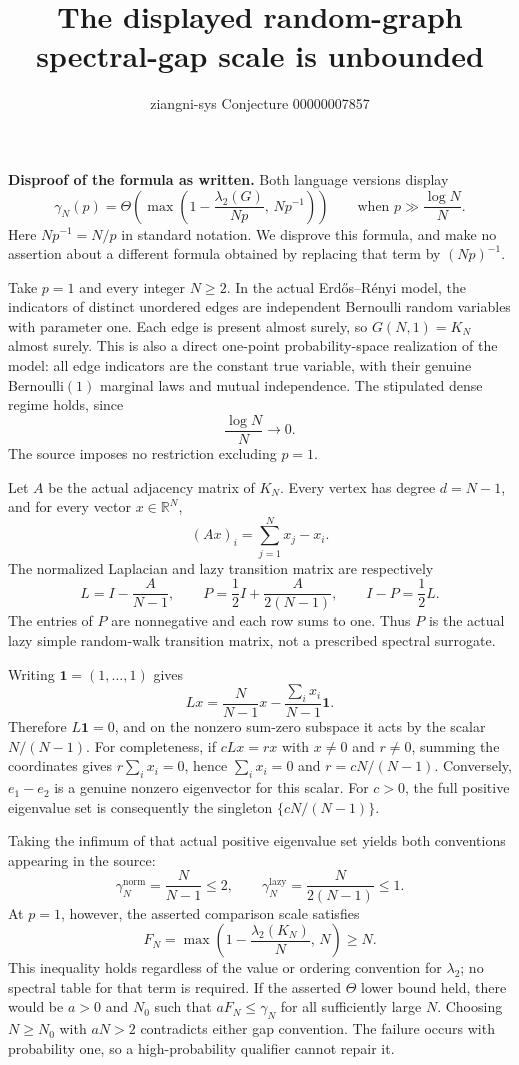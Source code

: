 \documentclass[11pt]{article}
\title{The displayed random-graph spectral-gap scale is unbounded}
\author{ziangni-sys \quad Conjecture 00000007857}
\date{}
\begin{document}
\maketitle
\vspace{-2em}
\textbf{Disproof of the formula as written.} Both language versions display
\[
 \gamma_N(p)=\Theta\!\left(\max\!\left(1-\frac{\lambda_2(G)}{Np},\,Np^{-1}\right)\right)
 \qquad\text{when }p\gg\frac{\log N}{N}.
\]
Here $Np^{-1}=N/p$ in standard notation. We disprove this formula, and make no assertion about a different formula obtained by replacing that term by $(Np)^{-1}$.

Take $p=1$ and every integer $N\ge2$. In the actual Erd\H{o}s--R\'enyi model, the indicators of distinct unordered edges are independent Bernoulli random variables with parameter one. Each edge is present almost surely, so $G(N,1)=K_N$ almost surely. This is also a direct one-point probability-space realization of the model: all edge indicators are the constant true variable, with their genuine Bernoulli$(1)$ marginal laws and mutual independence. The stipulated dense regime holds, since
\[
 \frac{\log N}{N}\longrightarrow0.
\]
The source imposes no restriction excluding $p=1$.

Let $A$ be the actual adjacency matrix of $K_N$. Every vertex has degree $d=N-1$, and for every vector $x\in\mathbb R^N$,
\[
 (Ax)_i=\sum_{j=1}^N x_j-x_i.
\]
The normalized Laplacian and lazy transition matrix are respectively
\[
 L=I-\frac{A}{N-1},\qquad P=\frac12I+\frac{A}{2(N-1)},
 \qquad I-P=\frac12L.
\]
The entries of $P$ are nonnegative and each row sums to one. Thus $P$ is the actual lazy simple random-walk transition matrix, not a prescribed spectral surrogate.

Writing $\mathbf1=(1,\ldots,1)$ gives
\[
 Lx=\frac{N}{N-1}x-\frac{\sum_i x_i}{N-1}\mathbf1.
\]
Therefore $L\mathbf1=0$, and on the nonzero sum-zero subspace it acts by the scalar $N/(N-1)$. For completeness, if $cLx=rx$ with $x\ne0$ and $r\ne0$, summing the coordinates gives $r\sum_i x_i=0$, hence $\sum_i x_i=0$ and $r=cN/(N-1)$. Conversely, $e_1-e_2$ is a genuine nonzero eigenvector for this scalar. For $c>0$, the full positive eigenvalue set is consequently the singleton $\{cN/(N-1)\}$.

Taking the infimum of that actual positive eigenvalue set yields both conventions appearing in the source:
\[
 \gamma_N^{\mathrm{norm}}=\frac{N}{N-1}\le2,
 \qquad
 \gamma_N^{\mathrm{lazy}}=\frac{N}{2(N-1)}\le1.
\]
At $p=1$, however, the asserted comparison scale satisfies
\[
 F_N=\max\!\left(1-\frac{\lambda_2(K_N)}N,\,N\right)\ge N.
\]
This inequality holds regardless of the value or ordering convention for $\lambda_2$; no spectral table for that term is required. If the asserted $\Theta$ lower bound held, there would be $a>0$ and $N_0$ such that $aF_N\le\gamma_N$ for all sufficiently large $N$. Choosing $N\ge N_0$ with $aN>2$ contradicts either gap convention. The failure occurs with probability one, so a high-probability qualifier cannot repair it.
\end{document}
